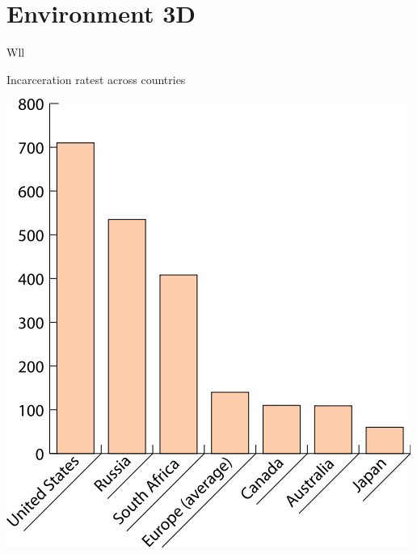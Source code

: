 \section{Environment 3D}

\begin{chart}{W}{ll}
\caption{Incarceration ratest across countries}
\label{chart:incarceration}
\includegraphics[width=\chartwidth,height=\chartheight]{incarceration}  
\end{chart}

\lipsum[1-4]

